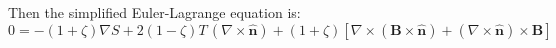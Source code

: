 \documentclass[reqno]{article}
\newcommand{\n}{\hat{\mathbf{n}}}
\begin{document}
\theendnotes

Then the simplified Euler-Lagrange equation is:
\begin{equation}
    0
    =
    -(1 + \zeta) \nabla S
    + 2 (1 - \zeta) T \, \left(\nabla \times \n\right)
    + (1 + \zeta) \left[ 
        \nabla \times \left( \mathbf{B} \times \n \right)
        + \left( \nabla \times \n \right) \times \mathbf{B}
    \right]
\end{equation}
\end{document}
